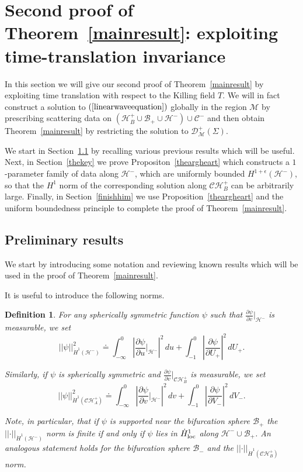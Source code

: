 \documentclass[A4,10pt]{article}
\newtheorem{definition}{Definition}[section]
\begin{document}
\section{Second proof of Theorem~\ref{mainresult}: exploiting time-translation invariance}
\label{timetranslate}
In this section we will give our second proof of Theorem~\ref{mainresult} by exploiting time translation with respect to the Killing field $T$. We will in fact construct a solution to $(\ref{linearwaveequation})$
globally in the region $\mathcal{M}$ by prescribing 
scattering data on $(\mathcal{H}^+_B\cup\mathcal{B}_+\cup\mathcal{H}^-)\cup\mathcal{C}^-$
and then obtain Theorem~\ref{mainresult} by restricting the solution to $\mathcal{D}^+_{\mathcal{M}}\left(\Sigma\right)$.

We start in Section~\ref{prelimtime} by recalling various previous results which will be useful. Next, in Section~\ref{thekey} we prove Propositon~\ref{theargheart} which constructs a $1$-parameter family of data along $\mathcal{H}^-$, which are uniformly bounded $H^{1+\epsilon}(\mathcal{H}^-)$, so that the $H^1$ norm of the corresponding solution along $\mathcal{CH}^+_B$ can be arbitrarily large. Finally, in Section~\ref{finishhim} we use Proposition~\ref{theargheart} and the uniform boundedness principle to complete the proof of Theorem~\ref{mainresult}.

\subsection{Preliminary results}\label{prelimtime}
We start by introducing some notation and reviewing known results which will be used in the proof of Theorem~\ref{mainresult}. 

It is useful to introduce the following norms.
\begin{definition}For any spherically symmetric function $\psi$ such that $\frac{\partial\psi}{\partial v}|_{\mathcal{H}^-}$ is measurable, we set
\[\left\vert\left\vert \psi\right\vert\right\vert_{\dot{H}^1\left(\mathcal{H}^-\right)}^2 \doteq \int_{-\infty}^0\left|\frac{\partial \psi}{\partial u}|_{\mathcal{H}^-}\right|^2\, du + \int_{-1}^0\left|\frac{\partial \psi}{\partial U_+}\right|^2\, dU_+.\]

Similarly, if $\psi$ is spherically symmetric and $\frac{\partial\psi}{\partial v}|_{\mathcal{CH}^+_B}$ is measurable, we set
\[\left\vert\left\vert \psi\right\vert\right\vert_{\dot{H}^1\left(\mathcal{CH}^+_A\right)}^2 \doteq \int_{-\infty}^0\left|\frac{\partial \psi}{\partial v}|_{\mathcal{H}^-}\right|^2\, dv + \int_{-1}^0\left|\frac{\partial \psi}{\partial V_-}\right|^2\, dV_-.\]

Note, in particular, that if $\psi$ is supported near the bifurcation sphere $\mathcal{B}_+$ the  $\left\vert\left\vert\cdot\right\vert\right\vert_{\dot{H}^1\left(\mathcal{H}^-\right)}$ norm is finite if and only if $\psi$ lies in $\dot{H}^1_{\rm loc}$ along $\mathcal{H}^-\cup\mathcal{B}_+$. An analogous statement holds for the bifurcation sphere $\mathcal{B}_-$ and 
the $\left\vert\left\vert\cdot\right\vert\right\vert_{\dot{H}^1\left(\mathcal{CH}^+_B\right)}$ norm.
\end{definition}
\end{document}
